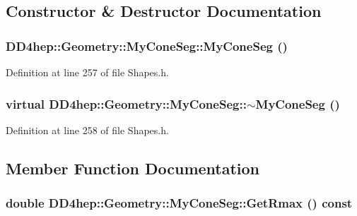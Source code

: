 \subsection{Constructor \& Destructor Documentation}
\hypertarget{class_d_d4hep_1_1_geometry_1_1_my_cone_seg_a9979507bda1f61e91e7859b4b6144025}{
\subsubsection[{MyConeSeg}]{\setlength{\rightskip}{0pt plus 5cm}DD4hep::Geometry::MyConeSeg::MyConeSeg ()}}
\label{class_d_d4hep_1_1_geometry_1_1_my_cone_seg_a9979507bda1f61e91e7859b4b6144025}


Definition at line 257 of file Shapes.h.\hypertarget{class_d_d4hep_1_1_geometry_1_1_my_cone_seg_a0042f0670c9b2367a0b8512564fc9b80}{
\subsubsection[{$\sim$MyConeSeg}]{\setlength{\rightskip}{0pt plus 5cm}virtual DD4hep::Geometry::MyConeSeg::$\sim$MyConeSeg ()}}
\label{class_d_d4hep_1_1_geometry_1_1_my_cone_seg_a0042f0670c9b2367a0b8512564fc9b80}


Definition at line 258 of file Shapes.h.

\subsection{Member Function Documentation}
\hypertarget{class_d_d4hep_1_1_geometry_1_1_my_cone_seg_a61b59a27d8135d02c4449bfa5569abe1}{
\subsubsection[{GetRmax}]{\setlength{\rightskip}{0pt plus 5cm}double DD4hep::Geometry::MyConeSeg::GetRmax () const}}
\label{class_d_d4hep_1_1_geometry_1_1_my_cone_seg_a61b59a27d8135d02c4449bfa5569abe1}


